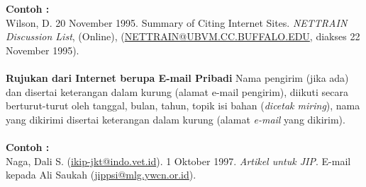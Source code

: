\\
\\
\textbf{Contoh :}
\\
Wilson,	D.	20	November	1995.	Summary	of	Citing	Internet	Sites. \textit{NETTRAIN	Discussion	List}, (Online),	(\url{NETTRAIN@UBVM.CC.BUFFALO.EDU},	diakses	22	November	1995).
\\
\\
\textbf{Rujukan	dari	Internet	berupa	E-mail	Pribadi}
Nama	 pengirim	 (jika	 ada)	 dan	 disertai	 keterangan	 dalam	 kurung	 (alamat	 e-mail	pengirim),	diikuti	secara	berturut-turut	oleh	tanggal,	bulan,	tahun,	topik	isi	bahan	(\textit{dicetak	
miring}),	 nama	 yang	 dikirimi	 disertai	 keterangan	 dalam	 kurung	 (alamat \textit{e-mail} yang	dikirim).
\\
\\
\textbf{Contoh :}
\\
Naga,	Dali	 S.	 (\url{ikip-jkt@indo.vet.id}).	 1	Oktober	 1997.	\textit{Artikel	 untuk	JIP}.	E-mail	 kepada	Ali	Saukah (\url{jippsi@mlg.ywcn.or.id}).